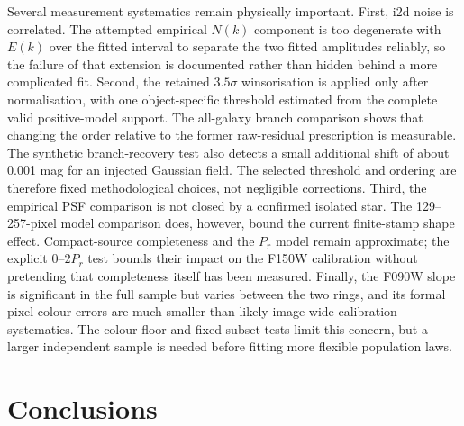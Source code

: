 \documentclass[nodoi,nocopyright]{pas}
\begin{document}
Several measurement systematics remain physically important. First, i2d noise is
correlated. The attempted empirical $N(k)$ component is too degenerate with
$E(k)$ over the fitted interval to separate the two fitted amplitudes
reliably, so the
failure of that extension is documented rather than hidden behind a more
complicated fit. Second, the retained $3.5\sigma$ winsorisation is applied only
after normalisation, with one object-specific threshold estimated from the
complete valid positive-model support.  The all-galaxy branch comparison shows
that changing the order relative to the former raw-residual prescription is
measurable. The synthetic branch-recovery test also detects a small
additional shift of about 0.001 mag for an injected Gaussian field.  The selected threshold and ordering are
therefore fixed methodological choices, not negligible corrections. Third,
the empirical PSF comparison is not closed by a confirmed isolated star. The
129--257-pixel model comparison does, however, bound the current finite-stamp
shape effect. Compact-source completeness and the $P_r$ model remain
approximate; the explicit $0$--$2P_r$ test bounds their impact on the F150W
calibration without pretending that completeness itself has been measured.
Finally, the F090W slope is significant in the full sample but varies between
the two rings, and its formal pixel-colour errors are much smaller than likely
image-wide calibration systematics. The colour-floor and fixed-subset tests
limit this concern, but a larger independent sample is needed before fitting
more flexible population laws.

\section{Conclusions}
\end{document}
